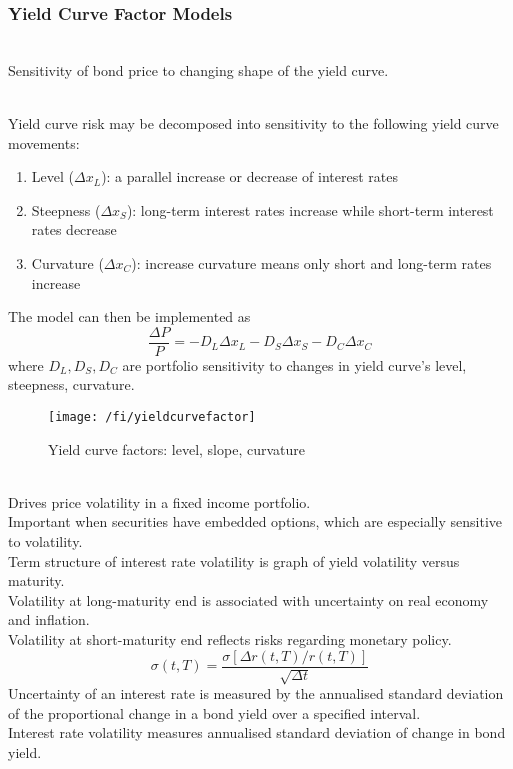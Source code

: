 \subsubsection{Yield Curve Factor Models}

\begin{definition} \\
Sensitivity of bond price to changing shape of the yield curve.
\end{definition}

\begin{definition} \\
Yield curve risk may be decomposed into sensitivity to the following yield curve movements:
\begin{enumerate}[label=\roman*.]
\setlength{\itemsep}{0pt}
\item Level ($\Delta x_L$): a parallel increase or decrease of interest rates
\item Steepness ($\Delta x_S$): long-term interest rates increase while short-term interest rates decrease
\item Curvature ($\Delta x_C$): increase curvature means only short and long-term rates increase
\end{enumerate}
The model can then be implemented as
\begin{equation}
\frac{\Delta P}{P} = -D_L \Delta x_L - D_S \Delta x_S - D_C \Delta x_C \nonumber
\end{equation}
where $D_L, D_S, D_C$ are portfolio sensitivity to changes in yield curve's level, steepness, curvature.
\end{definition}

\begin{figure}[H]
\centering
\texttt{[image: /fi/yieldcurvefactor]}
\caption{Yield curve factors: level, slope, curvature}
\end{figure}

\begin{remark}  \\
Drives price volatility in a fixed income portfolio.\\
Important when securities have embedded options, which are especially sensitive to volatility.\\
Term structure of interest rate volatility is graph of yield volatility versus maturity.\\
Volatility at long-maturity end is associated with uncertainty on real economy and inflation.\\
Volatility at short-maturity end reflects risks regarding monetary policy.
\begin{equation}
\sigma(t,T) = \frac{\sigma[\Delta r(t,T)/r(t,T)]}{\sqrt{\Delta t}} \nonumber
\end{equation}
Uncertainty of an interest rate is measured by the annualised standard deviation of the proportional change in a bond yield over a specified interval.\\
Interest rate volatility measures annualised standard deviation of change in bond yield.
\end{remark}

